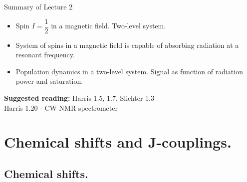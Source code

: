 \documentclass[handout]{beamer}
\begin{document}
\begin{frame}{Summary of Lecture 2}
	\begin{itemize}
		\item Spin $I= \dfrac{1}{2}$ in a magnetic field. Two-level system.
		\item System of spins in a magnetic field is capable of absorbing radiation at a resonant frequency.
		\item Population dynamics in a two-level system. Signal as function of radiation power and saturation.
	\end{itemize}
	\textbf{Suggested reading: } Harris 1.5, 1.7, Slichter 1.3 \\
	Harris 1.20 - CW NMR spectrometer
\end{frame}

\section{Chemical shifts and J-couplings.}
\subsection{Chemical shifts.}
\end{document}
